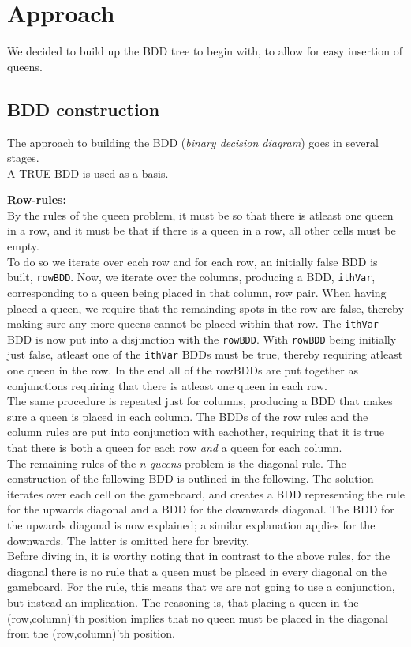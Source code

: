 
\section{Approach}
We decided to build up the BDD tree to begin with, to allow for easy insertion of queens.

\subsection{BDD construction}
The approach to building the BDD (\textit{binary decision diagram}) goes in several stages.\\
A TRUE-BDD is used as a basis. 

\textbf{Row-rules:}\\
By the rules of the queen problem, it must be so that there is atleast one queen in a row, and it must be that if there is a queen in a row, all other cells must be empty.\\
To do so we iterate over each row and for each row, an initially false BDD is built, \texttt{rowBDD}. Now, we iterate over the columns, producing a BDD, \texttt{ithVar}, corresponding to a queen being placed in that column, row pair. When having placed a queen, we require that the remainding spots in the row are false, thereby making sure any more queens cannot be placed within that row. The \texttt{ithVar} BDD is now put into a disjunction with the \texttt{rowBDD}.  With \texttt{rowBDD} being initially just false, atleast one of the \texttt{ithVar} BDDs must be true, thereby requiring atleast one queen in the row. In the end all of the rowBDDs are put together as conjunctions requiring that there is atleast one queen in each row.\\

The same procedure is repeated just for columns, producing a BDD that makes sure a queen is placed in each column. The BDDs of the row rules and the column rules are put into conjunction with eachother, requiring that it is true that there is both a queen for each row \textit{and} a queen for each column. \\

The remaining rules of the \textit{n-queens} problem is the diagonal rule. The construction of the following BDD is outlined in the following. 
The solution iterates over each cell on the gameboard, and creates a BDD representing the rule for the upwards diagonal and a BDD for the downwards diagonal. The BDD for the upwards diagonal is now explained; a similar explanation applies for the downwards. The latter is omitted here for brevity.\\
Before diving in, it is worthy noting that in contrast to the above rules, for the diagonal there is no rule that a queen must be placed in every diagonal on the gameboard. For the rule, this means that we are not going to use a conjunction, but instead an implication. The reasoning is, that placing a queen in the (row,column)'th position implies that no queen must be placed in the diagonal from the (row,column)'th position. \\

